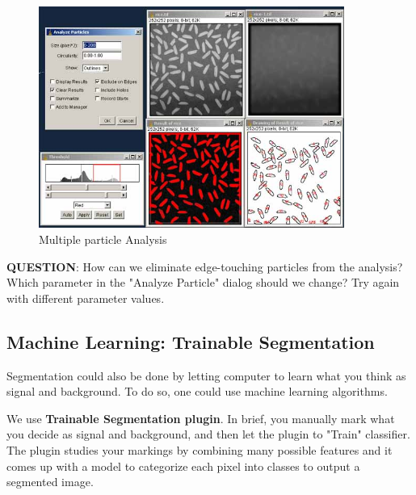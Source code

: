 \begin{indentexercise}{2}
\begin{figure}[H]
\begin{center}
\includegraphics[width=10cm]{fig/CMCIBasicCourse201102-img120.jpg}
\caption{ Multiple particle Analysis}
\label{fig:img120}
\end{center}
\end{figure}

\textbf{QUESTION}: How can we eliminate edge-touching particles from the
analysis? Which parameter in the "Analyze
Particle" dialog should we change? Try again with
different parameter values.
\end{indentexercise}

\subsection{Machine Learning: Trainable Segmentation}

Segmentation could also be done by letting computer to learn what you
think as signal and background. To do so, one could use machine
learning algorithms. 

We use \textbf{Trainable Segmentation plugin}.
In brief, you manually mark what you decide as signal and background, and then
let the plugin to "Train"
classifier. The plugin studies your markings by combining many possible features and it comes up with a model to
categorize each pixel into classes to output a segmented image. 
 
